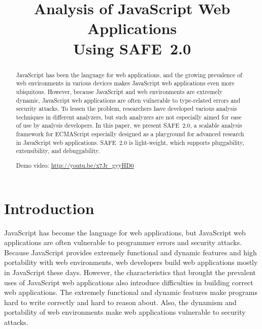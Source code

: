 \documentclass[10pt, conference]{IEEEtran}
\newcommand{\safe}{{SAFE~2.0}\xspace}
\begin{document}
\title{\hspace*{-.7em}
Analysis of JavaScript Web Applications\\ Using \safe}

\author{
\and
{}
\and
{}
\and
{}
}
\maketitle


\begin{abstract}
JavaScript has been the language for web applications, and
the growing prevalence of web environments in various devices
makes JavaScript web applications even more ubiquitous.
However, because JavaScript and web environments are
extremely dynamic, JavaScript web applications are often
vulnerable to type-related errors and security attacks.
To lessen the problem, researchers have developed various analysis
techniques in different analyzers, but such analyzers are not especially
aimed for ease of use by analysis developers.  In this paper, we present \safe, a scalable
analysis framework for ECMAScript especially designed as a playground
for advanced research in JavaScript web applications.  \safe is
light-weight, which supports pluggability, extensibility, and
debuggability.

Demo video: \url{http://youtu.be/x7Jr_gyyHD0}
\end{abstract}


\section{Introduction}
JavaScript has become the language for web applications, but
JavaScript web applications are often vulnerable to programmer
errors and security attacks.  Because JavaScript provides
extremely functional and dynamic features and high portability
with web environments, web developers build web applications
mostly in JavaScript these days.  However, the characteristics
that brought the prevalent uses of JavaScript web applications
also introduce difficulties in building correct web applications.
The extremely functional and dynamic features make programs
hard to write correctly and hard to reason about.
Also, the dynamism and portability of web environments make
web applications vulnerable to security attacks.
\end{document}
